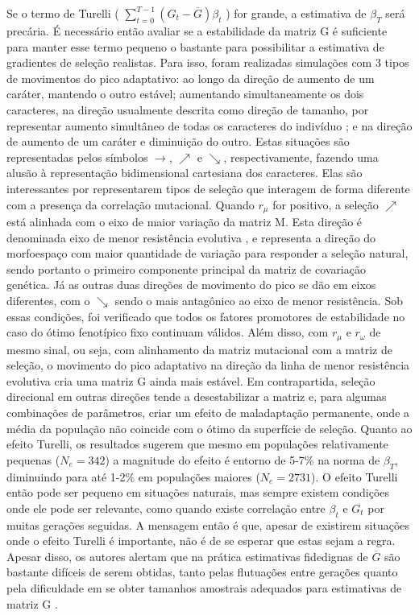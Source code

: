 Se o termo de Turelli ( $\sum_{t=0}^{T-1} (G_t - \overline {G})
\beta_t$ ) for grande, a estimativa de $\beta_T$ será precária.
É necessário então avaliar se a estabilidade da matriz G é suficiente
para manter esse termo pequeno o bastante para possibilitar a
estimativa de gradientes de seleção realistas.
Para isso, foram realizadas simulações com 3 tipos de movimentos do pico
adaptativo: ao longo da direção de aumento de um caráter, mantendo o outro
estável; aumentando simultaneamente os dois caracteres, na direção usualmente
descrita como direção de tamanho, por representar aumento simultâneo de
todas os caracteres do indivíduo \citep{Marroig2005}; e na direção de
aumento de um caráter e diminuição do outro.
Estas situações são representadas pelos símbolos $\rightarrow$,
$\nearrow$ e $\searrow$, respectivamente, fazendo uma alusão à
representação bidimensional cartesiana dos caracteres.
Elas são interessantes por representarem tipos de seleção que interagem
de forma diferente com a presença da correlação mutacional.
Quando $r_\mu$ for positivo, a seleção $\nearrow$ está alinhada com o
eixo de maior variação da matriz M.
Esta direção é denominada eixo de menor resistência evolutiva
\citep{Schluter1996}, e  representa a direção do morfoespaço com maior
quantidade de variação para responder a seleção natural, sendo portanto
o primeiro componente principal da matriz de covariação genética.
Já as outras duas direções de movimento do pico se dão em eixos
diferentes, com o $\searrow$ sendo o mais antagônico ao eixo de menor
resistência.
Sob essas condições, foi verificado que todos os fatores promotores de
estabilidade no caso do ótimo fenotípico fixo continuam válidos.
Além disso, com $r_\mu$ e $r_\omega$ de mesmo sinal, ou seja, com
alinhamento da matriz mutacional com a matriz de seleção, o movimento
do pico adaptativo na direção da linha de menor resistência evolutiva
cria uma matriz G ainda mais estável.
Em contrapartida, seleção direcional em outras direções tende a
desestabilizar a matriz e, para algumas combinações de parâmetros, criar
um efeito de maladaptação permanente, onde a média da população não
coincide com o ótimo da superfície de seleção.
Quanto ao efeito Turelli, os resultados sugerem que mesmo em populações
relativamente pequenas ($N_e=342$) a magnitude do efeito é entorno de
5-7\% na norma de $\beta_T$, diminuindo para até 1-2\% em populações
maiores ($N_e=2731$).
O efeito Turelli então pode ser pequeno em situações naturais, mas
sempre existem condições onde ele pode ser relevante, como quando existe
correlação entre $\beta_t$ e $G_t$ por muitas gerações seguidas.
A mensagem então é que, apesar de existirem situações onde o efeito
Turelli é importante, não é de se esperar que estas sejam a regra.
Apesar disso, os autores alertam que na prática estimativas fidedignas
de $\overline {G}$ são bastante difíceis de serem obtidas, tanto pelas
flutuações entre gerações quanto pela dificuldade em se obter tamanhos
amostrais adequados para estimativas de matriz G \citep{Marroig2011b}.

